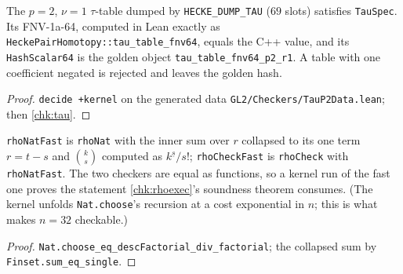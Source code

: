 \begin{theorem}[\texttt{obl:tau} (i)--(v), (vii) on the real $p=2$ table]\label{chk:tau-p2}
  \leanok
  The $p=2$, $\nu=1$ $\tau$-table dumped by \texttt{HECKE\_DUMP\_TAU} ($69$ slots) satisfies \texttt{TauSpec}. Its FNV-1a-64,
  computed in Lean exactly as \texttt{HeckePairHomotopy::tau\_table\_fnv64}, equals the C++ value, and its
  \texttt{HashScalar64} is the golden object \texttt{tau\_table\_fnv64\_p2\_r1}. A table with one coefficient negated is
  rejected and leaves the golden hash.
\end{theorem}
\begin{proof}
  \leanok
  \texttt{decide +kernel} on the generated data \texttt{GL2/Checkers/TauP2Data.lean}; then \ref{chk:tau}.
\end{proof}

\begin{definition}\label{chk:rhofast}
  \leanok
  \texttt{rhoNatFast} is \texttt{rhoNat} with the inner sum over $r$ collapsed to its one term $r=t-s$ and $\binom{k}{s}$
  computed as $k^{\underline{s}}/s!$; \texttt{rhoCheckFast} is \texttt{rhoCheck} with \texttt{rhoNatFast}. The two checkers are
  equal as functions, so a kernel run of the fast one proves the statement \ref{chk:rhoexec}'s soundness theorem consumes.
  (The kernel unfolds \texttt{Nat.choose}'s recursion at a cost exponential in $n$; this is what makes $n=32$ checkable.)
\end{definition}
\begin{proof}
  \leanok
  \texttt{Nat.choose\_eq\_descFactorial\_div\_factorial}; the collapsed sum by \texttt{Finset.sum\_eq\_single}.
\end{proof}

